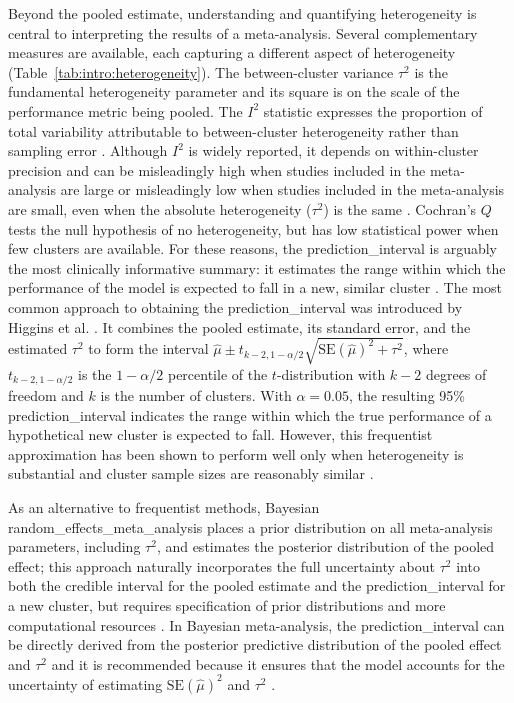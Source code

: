 Beyond the pooled estimate, understanding and quantifying \gls{heterogeneity} is central to interpreting the results of a meta-analysis. Several complementary measures are available, each capturing a different aspect of \gls{heterogeneity} (Table~\ref{tab:intro:heterogeneity}). The between-cluster variance $\tau^2$ is the fundamental \gls{heterogeneity} parameter and its square is on the scale of the performance metric being pooled. The $I^2$ statistic expresses the proportion of total variability attributable to between-cluster \gls{heterogeneity} rather than sampling error \cite{higginsQuantifyingHeterogeneityMetaanalysis2002}. Although $I^2$ is widely reported, it depends on within-cluster precision and can be misleadingly high when studies included in the meta-analysis are large or misleadingly low when studies included in the meta-analysis are small, even when the absolute \gls{heterogeneity} ($\tau^2$) is the same \cite{steyerbergAssessmentHeterogeneityIndividual2019}. Cochran's $Q$ tests the null hypothesis of no \gls{heterogeneity}, but has low statistical power when few clusters are available. For these reasons, the \gls{prediction_interval} is arguably the most clinically informative summary: it estimates the range within which the performance of the model is expected to fall in a new, similar cluster \cite{higginsReevaluationRandomeffectsMetaanalysis2009,partlettRandomEffectsMetaanalysis2017}. The most common approach to obtaining the \gls{prediction_interval} was introduced by Higgins et al. \cite{higginsReevaluationRandomeffectsMetaanalysis2009}. It combines the pooled estimate, its standard error, and the estimated $\tau^2$ to form the interval $\hat{\mu} \pm t_{k-2, 1-\alpha/2} \sqrt{\text{SE}(\hat{\mu})^2 + \tau^2}$, where $t_{k-2, 1-\alpha/2}$ is the $1-\alpha/2$ percentile of the $t$-distribution with $k-2$ degrees of freedom and $k$ is the number of clusters. With $\alpha = 0.05$, the resulting 95\% \gls{prediction_interval} indicates the range within which the true performance of a hypothetical new cluster is expected to fall. However, this frequentist approximation has been shown to perform well only when \gls{heterogeneity} is substantial and cluster sample sizes are reasonably similar \cite{partlettRandomEffectsMetaanalysis2017}. 

As an alternative to frequentist methods, Bayesian \gls{random_effects_meta_analysis} places a prior distribution on all meta-analysis parameters, including $\tau^2$, and estimates the posterior distribution of the pooled effect; this approach naturally incorporates the full uncertainty about $\tau^2$ into both the credible interval for the pooled estimate and the \gls{prediction_interval} for a new cluster, but requires specification of prior distributions and more computational resources \cite{higginsReevaluationRandomeffectsMetaanalysis2009}. In Bayesian meta-analysis, the \gls{prediction_interval} can be directly derived from the posterior predictive distribution of the pooled effect and $\tau^2$ and it is recommended because it ensures that the model accounts for the uncertainty of estimating $\text{SE}(\hat{\mu})^2$ and $\tau^2$ \cite{debrayFrameworkMetaanalysisPrediction2019} .

